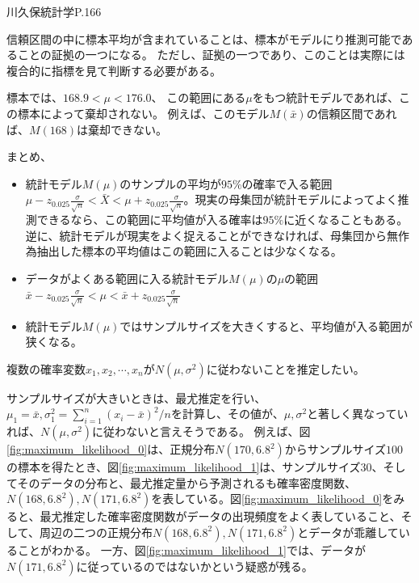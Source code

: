  川久保統計学P.166
 \fi



信頼区間の中に標本平均が含まれていることは、標本がモデルにり推測可能であることの証拠の一つになる。
ただし、証拠の一つであり、このことは実際には複合的に指標を見て判断する必要がある。


標本では、$168.9 < \mu < 176.0$、
この範囲にある$\mu$をもつ統計モデルであれば、この標本によって棄却されない。
例えば、このモデル$M(\bar{x})$の信頼区間であれば、$M(168)$は棄却できない。
\fi

まとめ、
\begin{framed}
    \begin{itemize}
        \item 統計モデル$M(\mu)$のサンプルの平均が$95\%$の確率で入る範囲$\mu - z_{0.025} \frac{\sigma}{\sqrt{n}} < \bar{X} < \mu + z_{0.025} \frac{\sigma}{\sqrt{n}}$。現実の母集団が統計モデルによってよく推測できるなら、この範囲に平均値が入る確率は$95\%$に近くなることもある。逆に、統計モデルが現実をよく捉えることができなければ、母集団から無作為抽出した標本の平均値はこの範囲に入ることは少なくなる。
        \item データがよくある範囲に入る統計モデル$M(\mu)$の$\mu$の範囲$\bar{x}- z_{0.025}\frac{\sigma}{\sqrt{n}} < \mu < \bar{x} + z_{0.025}\frac{\sigma}{\sqrt{n}}$
        \item  統計モデル$M(\mu)$ではサンプルサイズを大きくすると、平均値が入る範囲が狭くなる。
    \end{itemize}
\end{framed}
\fi




複数の確率変数$x_1,x_2,\cdots,x_n$が$N(\mu,\sigma^2)$に従わないことを推定したい。

サンプルサイズが大きいときは、最尤推定を行い、$\mu_1=\bar{x},\sigma_1^2=\sum_{i=1}^{n} (x_i-\bar{x})^2/n$を計算し、その値が、$\mu,\sigma^2$と著しく異なっていれば、$N(\mu,\sigma^2)$に従わないと言えそうである。
例えば、図\ref{fig:maximum_likelihood_0}は、正規分布$N(170,6.8^2)$からサンプルサイズ$100$の標本を得たとき、図\ref{fig:maximum_likelihood_1}は、サンプルサイズ$30$、そしてそのデータの分布と、最尤推定量から予測されるも確率密度関数、$N(168,6.8^2),N(171,6.8^2)$を表している。図\ref{fig:maximum_likelihood_0}をみると、最尤推定した確率密度関数がデータの出現頻度をよく表していること、そして、周辺の二つの正規分布$N(168,6.8^2),N(171,6.8^2)$とデータが乖離していることがわかる。
一方、図\ref{fig:maximum_likelihood_1}では、データが$N(171,6.8^2)$に従っているのではないかという疑惑が残る。
\fi

